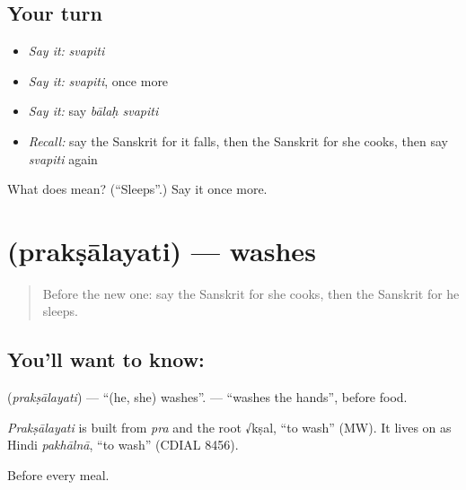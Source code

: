 \subsection*{Your turn}
\begin{itemize}
\raggedright
  \item \emph{Say it:} \emph{svapiti}
  \item \emph{Say it:} \emph{svapiti}, once more
  \item \emph{Say it:} say \emph{bālaḥ svapiti}
  \item \emph{Recall:} say the Sanskrit for it falls, then the Sanskrit for she cooks, then say \emph{svapiti} again
\end{itemize}

\begin{tcolorbox}[breakable,colback=teal!4,colframe=teal!35!black,title={Before you move on}]
What does  mean? (\textquotedblleft{}Sleeps\textquotedblright{}.) Say it once more.
\end{tcolorbox}
\section[\texorpdfstring{\sk{प्रक्षालयति} (prakṣālayati)}{प्रक्षालयति (prakṣālayati)}]{ (prakṣālayati) — washes}

\label{lesson:SA-C72-washes}



\begin{quote}
Before the new one: say the Sanskrit for she cooks, then the Sanskrit for he sleeps.
\end{quote}

\subsection*{You'll want to know: }
\textbf{} (\emph{prakṣālayati}) — \textquotedblleft{}(he, she) washes\textquotedblright{}. \textbf{ } — \textquotedblleft{}washes the hands\textquotedblright{}, before food.

\begin{cousinweb}
\emph{Prakṣālayati} is built from \emph{pra} and the root √kṣal, \textquotedblleft{}to wash\textquotedblright{} (MW). It lives on as Hindi \emph{pakhālnā}, \textquotedblleft{}to wash\textquotedblright{} (CDIAL 8456).
\end{cousinweb}

\begin{grammarlens}[title={What you've built}]
Before every meal.
\end{grammarlens}

